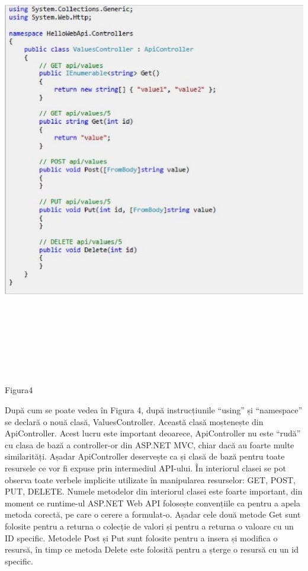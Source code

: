 \begin{center}
\includegraphics[width=15cm,height=20cm]{imagini/controller.eps} 
\caption{Figura4}
\end{center}
 
După cum se poate vedea în Figura 4, după instrucțiunile "`using"' și "`namespace"' se declară o nouă clasă, ValuesController. Această clasă moștenește din ApiController. Acest lucru este important deoarece, ApiController nu este "`rudă"' cu clasa de bază a controller-or din ASP.NET MVC, chiar dacă au foarte multe similarități. Așadar ApiController deservește ca și clasă de bază pentru toate resursele ce vor fi expuse prin intermediul API-ului.
În interiorul clasei se pot observa toate verbele implicite utilizate în manipularea resurselor: GET, POST, PUT, DELETE. Numele metodelor din interiorul clasei este foarte important, din moment ce runtime-ul ASP.NET Web API folosește convențiile ca pentru a apela metoda corectă, pe care o cerere a formulat-o. Așadar cele două metode Get sunt folosite pentru a returna o colecție de valori și pentru a returna o valoare cu un ID specific. Metodele Post și Put sunt folosite pentru a insera și modifica o resursă, în timp ce metoda Delete este folosită pentru a șterge o resursă cu un id specific.

